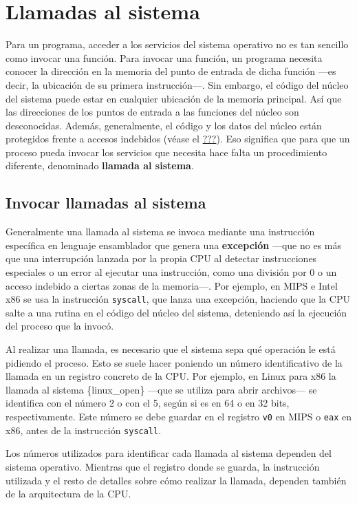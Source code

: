 \section{Llamadas al sistema}\label{_llamadas_al_sistema}

{} Para un programa, acceder a los servicios del sistema operativo no es
tan sencillo como invocar una función. Para invocar una función, un
programa necesita conocer la dirección en la memoria del punto de
entrada de dicha función ---es decir, la ubicación de su primera
instrucción---. Sin embargo, el código del núcleo del sistema puede
estar en cualquier ubicación de la memoria principal. Así que las
direcciones de los puntos de entrada a las funciones del núcleo son
desconocidas. Además, generalmente, el código y los datos del núcleo
están protegidos frente a accesos indebidos (véase el
\hyperref[_protecciuxf3n_de_la_memoria]{???}). Eso significa que para
que un proceso pueda invocar los servicios que necesita hace falta un
procedimiento diferente, denominado \textbf{llamada al sistema}.

\subsection{Invocar llamadas al
sistema}\label{_invocar_llamadas_al_sistema}

Generalmente una llamada al sistema se invoca mediante una instrucción
específica en lenguaje ensamblador que genera una \textbf{excepción}
---que no es más que una interrupción lanzada por la propia CPU al
detectar instrucciones especiales o un error al ejecutar una
instrucción, como una división por 0 o un acceso indebido a ciertas
zonas de la memoria---. Por ejemplo, en MIPS e Intel x86 se usa la
instrucción \texttt{syscall}, que lanza una excepción, haciendo que la
CPU salte a una rutina en el código del núcleo del sistema, deteniendo
así la ejecución del proceso que la invocó.

Al realizar una llamada, es necesario que el sistema sepa qué operación
le está pidiendo el proceso. Esto se suele hacer poniendo un número
identificativo de la llamada en un registro concreto de la CPU. Por
ejemplo, en Linux para x86 la llamada al sistema \{linux\_open\} ---que
se utiliza para abrir archivos--- se identifica con el número 2 o con el
5, según si es en 64 o en 32 bits, respectivamente. Este número se debe
guardar en el registro \texttt{v0} en MIPS o \texttt{eax} en x86, antes
de la instrucción \texttt{syscall}.

Los números utilizados para identificar cada llamada al sistema dependen
del sistema operativo. Mientras que el registro donde se guarda, la
instrucción utilizada y el resto de detalles sobre cómo realizar la
llamada, dependen también de la arquitectura de la CPU.

